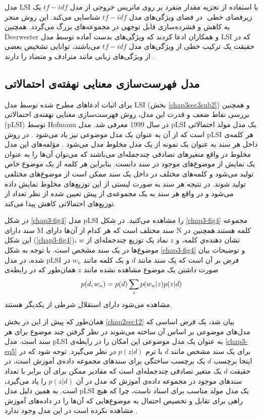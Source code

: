 	مدل
	LSI
	با استفاده از تجزیه مقدار منفرد
	 بر روی ماتریس خروجی از مدل
	$tf-idf$
	یک زیرفضای خطی
	‌ در فضای ویژگی‌‌های مدل
	$tf-idf$
	شناسایی می‌‌کند. این روش منجر به کاهش و فشرده‌سازی قابل توجهی‌ در مجموعه‌های بزرگ می‌‌گردد. همچنین
	Deerwester
	و همکاران ادعا کردند که ویژگی‌‌های بدست آماده توسط مدل
	LSI
	که در حقیقت یک ترکیب خطی‌ از ویژگی‌‌های مدل
	$tf-idf$
	می‌باشند، توانایی تشخیص بعضی‌ از ویژگی‌‌های زبانی مانند مترادف و متضاد را دارند
	\cite{deerwester1990indexing}.
	
	\subsection{مدل فهرست‌سازی معنایی نهفته‌ی احتمالاتی}
	\label{chap3sec3sub3}
	برای اثبات ادعا‌های مطرح شده توسط مدل
	LSI (بخش \ref{chap3sec3sub2})
	و همچنین بررسی‌ نقاط ضعف و قدرت این مدل، روش فهرست‌سازی معنایی نهفته‌ی احتمالاتی (pLSI)
	 توسط 
	Hofmann \cite{hofmann1999probabilistic}
در سال 1999 معرفی شد. مدل 
	pLSI
	یک مدل مولد احتمالاتی است که از آن به عنوان یک مدل موضوعی نیز یاد می‌شود
	\cite{blei2003latent}.
	 در روش 
	 pLSI
	 هر کلمه‌ی داخل هر سند به عنوان یک نمونه از یک مدل مخلوط مدل می‌شود
	 \cite{hofmann1999probabilistic}.
	  مؤلفه‌های این مدل مخلوط در واقع متغیرهای تصادفی چندجمله‌ای می‌باشند که می‌توان آن‌ها را به عنوان یک نمایش از موضوع‌های موجود در سند دانست. بنابراین هر کلمه از یک موضوع خاص تولید می‌‌شود و کلمه‌های مختلف در داخل یک سند ممکن است از موضوع‌های مختلفی‌ تولید شوند. در نتیجه هر سند به صورت لیستی از این توزیع‌های مخلوط نمایش داده می‌‌شود و در واقع هر سند به یک مجموعه‌ی از پیش تعیین شده از نظر تعداد از توزیع‌های احتمالاتی کاهش پیدا می‌کند.
	
	در شکل
	\ref{chap3-fig4}
	مدل
	pLSI
	را مشاهده می‌کنید‌. در شکل
	\ref{chap3-fig4}
	 مجموعه سند دارای
	M
	سند مختلف است که هر کدام از آن‌ها دارای
	N
	کلمه‌ هستند.همچنین در این شکل
	(\ref{chap3-fig4})، $w$
	نشان دهنده‌ي کلمه، و
	$z$
	نماد یک توزیع چندجمله‌ای از موضوع‌ها در یک سند مشخص است. با توجه به شکل
	\ref{chap3-fig4}
	و توضیحات بیان شده، در مدل
	pLSI
	فرض بر آن است که یک سند مانند
	$d$
	و یک کلمه‌ مانند
	$w_n$
	در صورت داشتن یک موضوع مشاهده نشده مانند
	$z$
	همان‌طور که در رابطه‌ی
	\begin{align}
		\centering
		\label{chap3-eq5}
		p(d,w_n) = p(d) \sum_{z} p(w_n|z)p(z|d)
	\end{align}
	مشاهده می‌‌شود دارای استقلال شرطی از یکدیگر هستند.

	همان‌طور که پیش از این در بخش
	\ref{chap2sec12}
	بیان شد، یک فرض اساسی‌ که مدل‌های موضوعی بر اساس آن ساخته می‌‌شوند در نظر گرفتن چند موضوع برای هر سند است. مدل
	pLSI
	به عنوان یک مدل موضوعی این امکان را در رابطه‌ی
	\ref{chap3-eq5}
	برای یک سند مشخص مانند
	$d$
	با ترم
	$p(z|d)$
	در نظر می‌‌گیرد. توجه شود که در اینجا برچسب
	$d$
	یک برچسب ساختگی برای سند‌های مجموعه داده‌ی آموزش است، در حقیقت
	$d$
	یک متغیر تصادفی چندجمله‌ای است که مقادیر ممکن برای آن برابر با تعداد سند‌های موجود در مجموعه داده‌ی آموزش که مدل در آن
	$p(z|d)$
	را یاد می‌‌گیرد، است. به همین دلیل مدل
	pLSI
	یک مدل مولد مناسب برای اسناد‌ ناست، چرا که هیچ راهی‌ برای تقابل و تخصیص احتمال به موضوع‌هایی که آن‌ها را در داده‌های آموزش مشاهده 
	نکرده است در این مدل وجود ندارد
	\cite{blei2003latent}.
	
